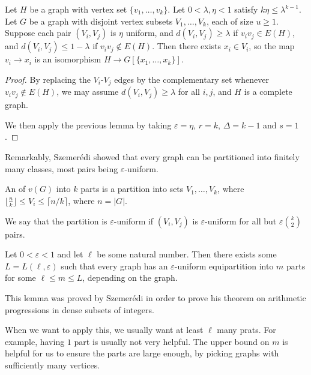 \documentclass[a4paper]{article}
\begin{document}
\begin{cor}
  Let $H$ be a graph with vertex set $\{v_1, \ldots, v_k\}$. Let $0 < \lambda, \eta < 1$ satisfy $k \eta \leq \lambda^{k - 1}$. Let $G$ be a graph with disjoint vertex subsets $V_1, \ldots, V_k$, each of size $u \geq 1$. Suppose each pair $(V_i, V_j)$ is $\eta$ uniform, and $d(V_i, V_j) \geq \lambda$ if $v_i v_j \in E(H)$, and $d(V_i, V_j) \leq 1 - \lambda$ if $v_i v_j \not \in E(H)$. Then there exists $x_i \in V_i$, so the map $v_i \to x_i$ is an isomorphism $H \to G[\{x_1, \ldots, x_k\}]$.
\end{cor}

\begin{proof}
  By replacing the $V_i$-$V_j$ edges by the complementary set whenever $v_i v_j \not \in E(H)$, we may assume $d(V_i, V_j) \geq \lambda$ for all $i, j$, and $H$ is a complete graph.

  We then apply the previous lemma by taking $\varepsilon = \eta$, $r = k$, $\Delta = k- 1$ and $s = 1$.
\end{proof}

Remarkably, Szemer\'edi showed that every graph can be partitioned into finitely many classes, most pairs being $\varepsilon$-uniform.

An  of $v(G)$ into $k$ parts is a partition into sets $V_1, \ldots, V_k$, where $\lfloor \frac{n}{k} \rfloor \leq V_i \leq \lceil n/k\rceil$, where $n = |G|$.

We say that the partition is $\varepsilon$-uniform if $(V_i, V_j)$ is $\varepsilon$-uniform for all but $\varepsilon \binom{k}{2}$ pairs.

\begin{thm}
  Let $0 < \varepsilon < 1$ and let $\ell$ be some natural number. Then there exists some $L = L(\ell, \varepsilon)$ such that every graph has an $\varepsilon$-uniform equipartition into $m$ parts for some $\ell \leq m \leq L$, depending on the graph.
\end{thm}
This lemma was proved by Szemer\'edi in order to prove his theorem on arithmetic progressions in dense subsets of integers.

When we want to apply this, we usually want at least $\ell$ many prats. For example, having $1$ part is usually not very helpful. The upper bound on $m$ is helpful for us to ensure the parts are large enough, by picking graphs with sufficiently many vertices.
\end{document}
